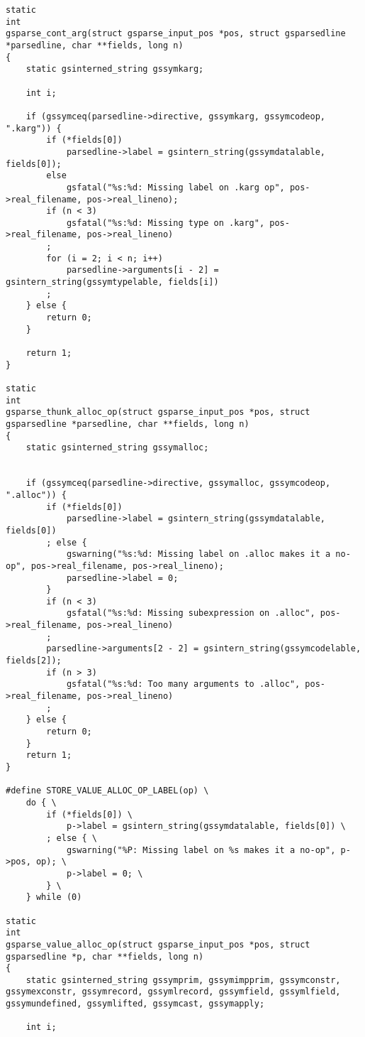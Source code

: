 \documentclass{report}
\begin{document}
\begin{verbatim}
static
int
gsparse_cont_arg(struct gsparse_input_pos *pos, struct gsparsedline *parsedline, char **fields, long n)
{
    static gsinterned_string gssymkarg;

    int i;

    if (gssymceq(parsedline->directive, gssymkarg, gssymcodeop, ".karg")) {
        if (*fields[0])
            parsedline->label = gsintern_string(gssymdatalable, fields[0]);
        else
            gsfatal("%s:%d: Missing label on .karg op", pos->real_filename, pos->real_lineno);
        if (n < 3)
            gsfatal("%s:%d: Missing type on .karg", pos->real_filename, pos->real_lineno)
        ;
        for (i = 2; i < n; i++)
            parsedline->arguments[i - 2] = gsintern_string(gssymtypelable, fields[i])
        ;
    } else {
        return 0;
    }

    return 1;
}

static
int
gsparse_thunk_alloc_op(struct gsparse_input_pos *pos, struct gsparsedline *parsedline, char **fields, long n)
{
    static gsinterned_string gssymalloc;


    if (gssymceq(parsedline->directive, gssymalloc, gssymcodeop, ".alloc")) {
        if (*fields[0])
            parsedline->label = gsintern_string(gssymdatalable, fields[0])
        ; else {
            gswarning("%s:%d: Missing label on .alloc makes it a no-op", pos->real_filename, pos->real_lineno);
            parsedline->label = 0;
        }
        if (n < 3)
            gsfatal("%s:%d: Missing subexpression on .alloc", pos->real_filename, pos->real_lineno)
        ;
        parsedline->arguments[2 - 2] = gsintern_string(gssymcodelable, fields[2]);
        if (n > 3)
            gsfatal("%s:%d: Too many arguments to .alloc", pos->real_filename, pos->real_lineno)
        ;
    } else {
        return 0;
    }
    return 1;
}

#define STORE_VALUE_ALLOC_OP_LABEL(op) \
    do { \
        if (*fields[0]) \
            p->label = gsintern_string(gssymdatalable, fields[0]) \
        ; else { \
            gswarning("%P: Missing label on %s makes it a no-op", p->pos, op); \
            p->label = 0; \
        } \
    } while (0)

static
int
gsparse_value_alloc_op(struct gsparse_input_pos *pos, struct gsparsedline *p, char **fields, long n)
{
    static gsinterned_string gssymprim, gssymimpprim, gssymconstr, gssymexconstr, gssymrecord, gssymlrecord, gssymfield, gssymlfield, gssymundefined, gssymlifted, gssymcast, gssymapply;

    int i;


\end{verbatim}
\end{document}
